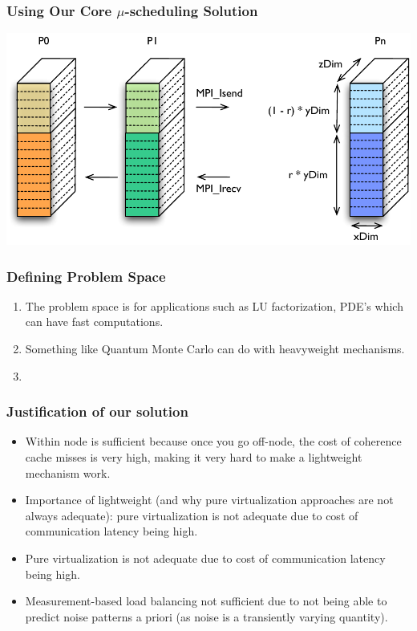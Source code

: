 \begin{frame}
\frametitle{Using Our Core $\mu$-scheduling Solution}
\includegraphics[width=\textwidth]{images/hybrid_decomp}
\end{frame}


\begin{frame}
\frametitle{Defining Problem Space} 
\begin{enumerate} 
\item  \small The problem space is for applications such as LU factorization, PDE's which can have fast computations. 
\item \small Something like Quantum Monte Carlo can do with heavyweight mechanisms. 
\item \small 
\end{enumerate} 
\end{frame}

\begin{frame} 
\frametitle{Justification of our solution}
\begin{itemize} 
\item \small Within node is sufficient because once you go off-node,
  the cost of coherence cache misses is very high, making it very hard
  to make a lightweight mechanism work. 
\item \small Importance of lightweight (and why pure virtualization
  approaches are not always adequate): pure virtualization is not
  adequate due to cost of communication latency being high. 
\item \small Pure virtualization is not adequate due to cost of
  communication latency being high. 
\item \small Measurement-based load balancing not sufficient due to
  not being able to predict noise patterns a priori (as noise is a
  transiently varying quantity). 
\end{itemize}
\end{frame}


